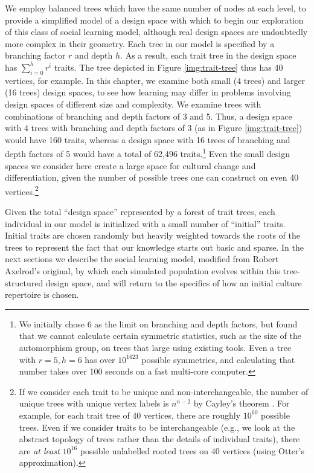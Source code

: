 \documentclass[graybox,natbib]{svmult}
\begin{document}
We employ balanced trees which have the same number of nodes at each
level, to provide a simplified model of a design space with which to
begin our exploration of this class of social learning model, although
real design spaces are undoubtedly more complex in their geometry. Each
tree in our model is specified by a branching factor $r$ and depth $h$.
As a result, each trait tree in the design space has
$\sum_{i=0}^{h} r^i$ traits. The tree depicted in Figure
\ref{img:trait-tree} thus has 40 vertices, for example. In this chapter,
we examine both small (4 trees) and larger (16 trees) design spaces, to
see how learning may differ in problems involving design spaces of
different size and complexity. We examine trees with combinations of
branching and depth factors of 3 and 5. Thus, a design space with 4
trees with branching and depth factors of 3 (as in Figure
\ref{img:trait-tree}) would have 160 traits, whereas a design space with
16 trees of branching and depth factors of 5 would have a total of
62,496 traits.\footnote{We initially chose 6 as the limit on branching
  and depth factors, but found that we cannot calculate certain
  symmetric statistics, such as the size of the automorphism group, on
  trees that large using existing tools. Even a tree with $r=5, h=6$ has
  over $10^{1623}$ possible symmetries, and calculating that number
  takes over 100 seconds on a fast multi-core computer.} Even the small
design spaces we consider here create a large space for cultural change
and differentiation, given the number of possible trees one can
construct on even 40 vertices.\footnote{If we consider each trait to be
  unique and non-interchangeable, the number of unique trees with unique
  vertex labels is $n^{n-2}$ by Cayley's theorem
  \citep{diestel2010graph}. For example, for each trait tree of 40
  vertices, there are roughly $10^{60}$ possible trees. Even if we
  consider traits to be interchangeable (e.g., we look at the abstract
  topology of trees rather than the details of individual traits), there
  are \emph{at least} $10^{16}$ possible unlabelled rooted trees on 40
  vertices (using Otter's \citeyearpar{otter1948number} approximation).}

Given the total ``design space'' represented by a forest of trait trees,
each individual in our model is initialized with a small number of
``initial'' traits. Initial traits are chosen randomly but heavily
weighted towards the roots of the trees to represent the fact that our
knowledge starts out basic and sparse. In the next sections we describe
the social learning model, modified from Robert Axelrod's original, by
which each simulated population evolves within this tree-structured
design space, and will return to the specifics of how an initial culture
repertoire is chosen.
\end{document}
